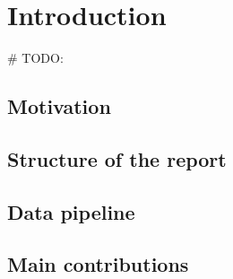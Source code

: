 
\chapter{Introduction} %
\label{Chapter1} %

\# TODO:


\newcommand{\keyword}[1]{\textbf{#1}}
\newcommand{\tabhead}[1]{\textbf{#1}}
\newcommand{\code}[1]{\texttt{#1}}
\newcommand{\file}[1]{\texttt{\bfseries#1}}
\newcommand{\option}[1]{\texttt{\itshape#1}}


\section{Motivation}
\label{motivation}


\section{Structure of the report}



\section{Data pipeline}



\section{Main contributions}

